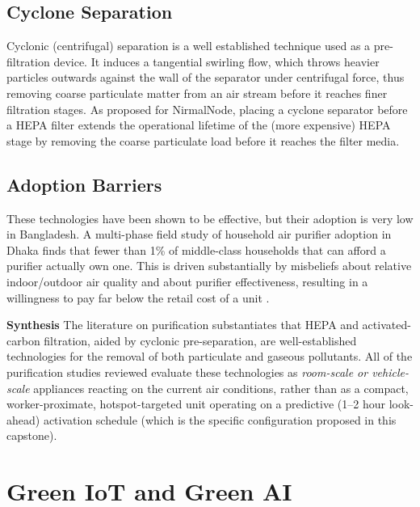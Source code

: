 \subsection{Cyclone Separation}
Cyclonic (centrifugal) separation is a well established technique used as a pre-filtration device. It induces a tangential swirling flow, which throws heavier particles outwards against the wall of the separator under centrifugal force, thus removing coarse particulate matter from an air stream before it reaches finer filtration stages. As proposed for NirmalNode, placing a cyclone separator before a HEPA filter extends the operational lifetime of the (more expensive) HEPA stage by removing the coarse particulate load before it reaches the filter media.

\subsection{Adoption Barriers}
These technologies have been shown to be effective, but their adoption is very low in Bangladesh. A multi-phase field study of household air purifier adoption in Dhaka finds that fewer than 1\% of middle-class households that can afford a purifier actually own one. This is driven substantially by misbeliefs about relative indoor/outdoor air quality and about purifier effectiveness, resulting in a willingness to pay far below the retail cost of a unit \citep{chowdhury2025misbeliefs}.

\textbf{Synthesis} The literature on purification substantiates that HEPA and activated-carbon filtration, aided by cyclonic pre-separation, are well-established technologies for the removal of both particulate and gaseous pollutants. All of the purification studies reviewed evaluate these technologies as \emph{room-scale or vehicle-scale} appliances reacting on the current air conditions, rather than as a compact, worker-proximate, hotspot-targeted unit operating on a predictive (1--2 hour look-ahead) activation schedule (which is the specific configuration proposed in this capstone).

\section{Green IoT and Green AI}
\label{sec:lr-green}

